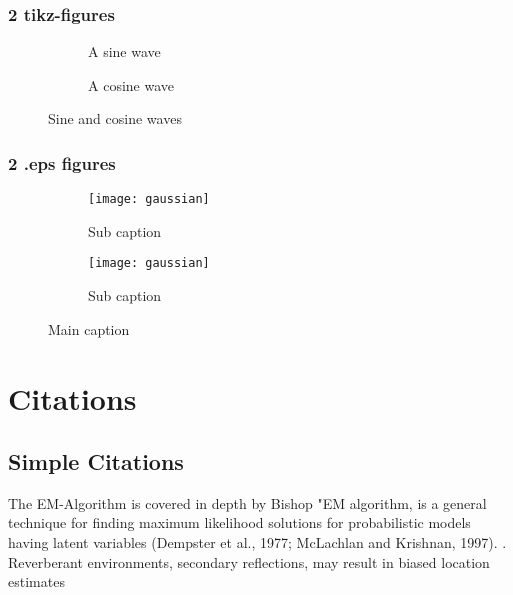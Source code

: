 \subsubsection{2 tikz-figures}
\begin{figure}[H]
	\centering
	\begin{subfigure}{0.49\textwidth}
		
		\caption{A sine wave}
	\end{subfigure}
	\begin{subfigure}{0.49\textwidth}
		
		\caption{A cosine wave}
	\end{subfigure}
	\caption{Sine and cosine waves}
	\label{fig:sin}
\end{figure}

\subsubsection{2 .eps figures}
\begin{figure}[H]
 \centering
 \begin{subfigure}{0.49\textwidth}
    \texttt{[image: gaussian]}
    \caption{Sub caption}
 \end{subfigure}
 \begin{subfigure}{0.49\textwidth}
    \texttt{[image: gaussian]}
    \caption{Sub caption}
 \end{subfigure}
 \caption{Main caption}
\end{figure}

\newpage
\section{Citations}
\subsection{Simple Citations}
The EM-Algorithm is covered in depth by Bishop "EM algorithm, is a general technique for finding maximum likelihood solutions for probabilistic models having latent variables (Dempster et al., 1977; McLachlan and Krishnan, 1997). \cite[p. 472]{Bishop2006}. Reverberant environments, secondary reflections, may result in biased location estimates \cite[p.1]{Schwartz2014}